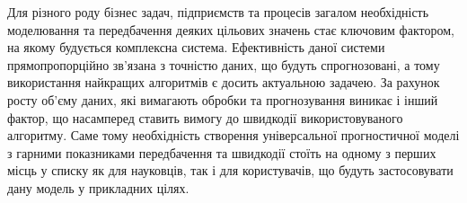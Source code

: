 Для різного роду бізнес задач, підприємств та процесів загалом необхідність моделювання та передбачення деяких цільових значень стає ключовим фактором, на якому будується комплексна система. Ефективність даної системи прямопропорційно зв'язана з точністю даних, що будуть спрогнозовані, а тому використання найкращих алгоритмів є досить актуальною задачею. За рахунок росту об'єму даних, які вимагають обробки та прогнозування виникає і інший фактор, що насамперед ставить вимогу до швидкодії використовуваного алгоритму. Саме тому необхідність створення універсальної прогностичної моделі з гарними показниками передбачення та швидкодії стоїть на одному з перших місць у списку як для науковців, так і для користувачів, що будуть застосовувати дану модель у прикладних цілях.
